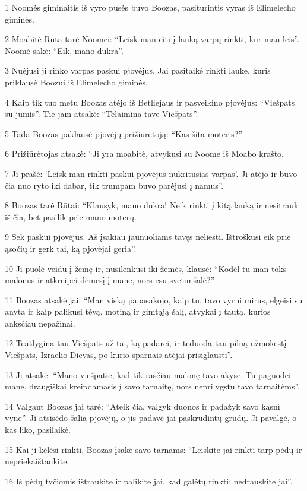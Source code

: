 \par 1 Noomės giminaitis iš vyro pusės buvo Boozas, pasiturintis vyras iš Elimelecho giminės. 
\par 2 Moabitė Rūta tarė Noomei: “Leisk man eiti į lauką varpų rinkti, kur man leis”. Noomė sakė: “Eik, mano dukra”. 
\par 3 Nuėjusi ji rinko varpas paskui pjovėjus. Jai pasitaikė rinkti lauke, kuris priklausė Boozui iš Elimelecho giminės. 
\par 4 Kaip tik tuo metu Boozas atėjo iš Betliejaus ir pasveikino pjovėjus: “Viešpats su jumis”. Tie jam atsakė: “Telaimina tave Viešpats”. 
\par 5 Tada Boozas paklausė pjovėjų prižiūrėtoją: “Kas šita moteris?” 
\par 6 Prižiūrėtojas atsakė: “Ji yra moabitė, atvykusi su Noome iš Moabo krašto. 
\par 7 Ji prašė: ‘Leisk man rinkti paskui pjovėjus nukritusias varpas’. Ji atėjo ir buvo čia nuo ryto iki dabar, tik trumpam buvo parėjusi į namus”. 
\par 8 Boozas tarė Rūtai: “Klausyk, mano dukra! Neik rinkti į kitą lauką ir nesitrauk iš čia, bet pasilik prie mano moterų. 
\par 9 Sek paskui pjovėjus. Aš įsakiau jaunuoliams tavęs neliesti. Ištroškusi eik prie ąsočių ir gerk tai, ką pjovėjai geria”. 
\par 10 Ji puolė veidu į žemę ir, nusilenkusi iki žemės, klausė: “Kodėl tu man toks malonus ir atkreipei dėmesį į mane, nors esu svetimšalė?” 
\par 11 Boozas atsakė jai: “Man viską papasakojo, kaip tu, tavo vyrui mirus, elgeisi su anyta ir kaip palikusi tėvą, motiną ir gimtąją šalį, atvykai į tautą, kurios anksčiau nepažinai. 
\par 12 Teatlygina tau Viešpats už tai, ką padarei, ir teduoda tau pilną užmokestį Viešpats, Izraelio Dievas, po kurio sparnais atėjai prisiglausti”. 
\par 13 Ji atsakė: “Mano viešpatie, kad tik rasčiau malonę tavo akyse. Tu paguodei mane, draugiškai kreipdamasis į savo tarnaitę, nors neprilygstu tavo tarnaitėms”. 
\par 14 Valgant Boozas jai tarė: “Ateik čia, valgyk duonos ir padažyk savo kąsnį vyne”. Ji atsisėdo šalia pjovėjų, o jis padavė jai paskrudintų grūdų. Ji pavalgė, o kas liko, pasilaikė. 
\par 15 Kai ji kėlėsi rinkti, Boozas įsakė savo tarnams: “Leiskite jai rinkti tarp pėdų ir nepriekaištaukite. 
\par 16 Iš pėdų tyčiomis ištraukite ir palikite jai, kad galėtų rinkti; nedrauskite jai”. 
